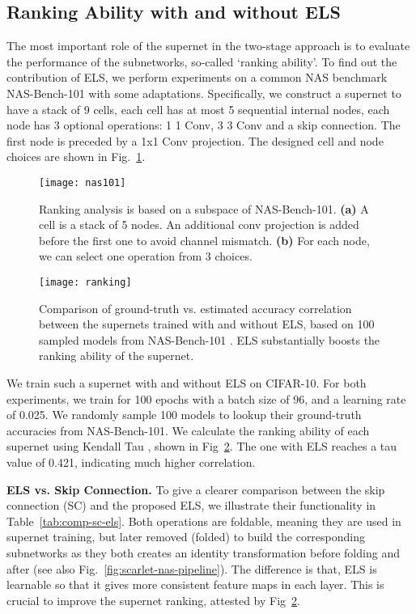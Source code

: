 \documentclass[runningheads]{llncs}
\begin{document}
\subsection{Ranking Ability with and without ELS}

The most important role of the supernet in the two-stage approach is to evaluate the performance of the subnetworks, so-called  `ranking ability'. To find out the contribution of ELS, we perform experiments on a common NAS benchmark NAS-Bench-101 \cite{ying2019bench} with some adaptations. Specifically, we construct a supernet to have a stack of 9 cells, each cell has at most 5 sequential internal nodes, each node has 3 optional operations: 1  1 Conv, 3  3 Conv and a skip connection. The first node is preceded by a 1x1 Conv projection. The designed cell and node choices are shown in Fig.~\ref{fig:nas-101}. 

\begin{figure}
	\centering
	\texttt{[image: nas101]}
	\caption{Ranking analysis is based on a subspace of NAS-Bench-101. \textbf{(a)} A cell is a stack of 5 nodes. An additional  conv projection is added before the first one to avoid channel mismatch. \textbf{(b)} For each node, we can select one operation from 3 choices.}
	\label{fig:nas-101}
\end{figure} 


\begin{figure}
	\centering
	\texttt{[image: ranking]}
	\caption{Comparison of ground-truth vs. estimated accuracy correlation between the supernets trained with and without ELS, based on 100 sampled models from NAS-Bench-101 \cite{ying2019bench}. ELS substantially boosts the ranking ability of the supernet.}
	\label{fig:ranking}
\end{figure} 

We train such a supernet with and without ELS on CIFAR-10. 
For both experiments, we train for 100 epochs with a batch size of 96, and a learning rate of 0.025. We randomly sample 100 models to lookup their ground-truth accuracies from NAS-Bench-101. We calculate the ranking ability of each supernet using Kendall Tau \cite{kendall1938new}, shown in Fig~\ref{fig:ranking}. The one with ELS reaches a  tau value of 0.421, indicating much higher correlation.










\textbf{ELS vs. Skip Connection.} To give a clearer comparison between the skip connection (SC) and the proposed ELS, we illustrate their functionality in Table~\ref{tab:comp-sc-els}. Both operations are foldable, meaning they are used in supernet training, but later removed (folded) to build the corresponding subnetworks as they both creates an identity transformation before folding and after (see also Fig.~\ref{fig:scarlet-nas-pipeline}). The difference is that, ELS is learnable so that it gives more consistent feature maps in each layer. This is crucial to improve the supernet ranking, attested by Fig~\ref{fig:ranking}.
\end{document}

